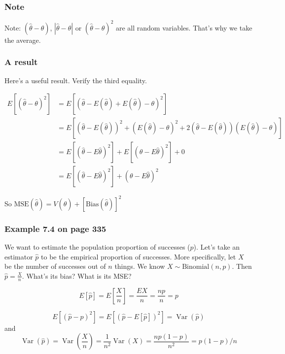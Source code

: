 \documentclass{beamer}
\begin{document}

\begin{frame}
\frametitle{Note}

Note: $(\hat{\theta} - \theta )$, $|\hat{\theta} - \theta |$ or $(\hat{\theta} - \theta )^2$ are all random variables. That's why we take the average. 

\end{frame}


\begin{frame}
\frametitle{A result}

Here's a useful result. Verify the third equality.

\begin{align*}
E\left[(\hat{\theta} - \theta )^2 \right] &= E\left[(\hat{\theta} - E(\hat{\theta}) + E(\hat{\theta}) - \theta )^2 \right] \\
&= E\left[  \left(\hat{\theta} - E(\hat{\theta}) \right)^2  + \left( E(\hat{\theta}) - \theta \right)^2 + 2\left( \hat{\theta} - E(\hat{\theta}) \right)\left( E(\hat{\theta}) - \theta \right) \right] \\
&= E\left[(\hat{\theta} - E\hat{\theta})^2 \right]  + E\left[(\theta - E\hat{\theta} )^2 \right] +0 \\
&= E\left[(\hat{\theta} - E\hat{\theta})^2 \right]  + (\theta - E\hat{\theta} )^2 
\end{align*}

So $\text{MSE}(\hat{\theta}) = V(\hat{\theta}) + \left[\text{Bias}(\hat{\theta})\right] ^2$

\end{frame}


\begin{frame}
\frametitle{Example 7.4 on page 335}

We want to estimate the population proportion of successes ($p$). Let's take an estimator $\hat{p}$ to be the empirical proportion of successes. More specifically, let $X$ be the number of successes out of $n$ things. We know $X \sim \text{Binomial}(n,p)$. Then $\hat{p} = \frac{X}{n}$. What's its bias? What is its MSE?
\pause
\newline

\[
E[\hat{p}] = E\left[ \frac{X}{n} \right] =  \frac{EX}{n} = \frac{np}{n} = p
\]
\pause

\[
E[(\hat{p} - p)^2] = E[(\hat{p} - E[\hat{p}] )^2] = \operatorname{Var}(\hat{p}) 
\]
and
\[
\operatorname{Var}(\hat{p}) = \operatorname{Var}\left( \frac{X}{n} \right) = \frac{1}{n^2}\operatorname{Var}(X)   = \frac{np(1-p)}{n^2} = p(1-p)/n
\]

\end{frame}
\end{document}
